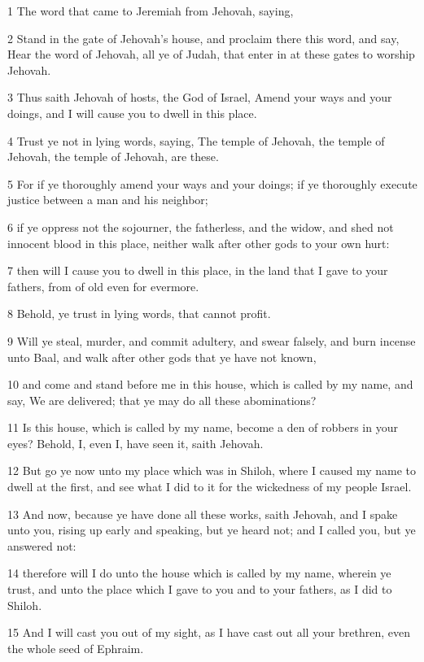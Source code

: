 \par 1 The word that came to Jeremiah from Jehovah, saying,
\par 2 Stand in the gate of Jehovah's house, and proclaim there this word, and say, Hear the word of Jehovah, all ye of Judah, that enter in at these gates to worship Jehovah.
\par 3 Thus saith Jehovah of hosts, the God of Israel, Amend your ways and your doings, and I will cause you to dwell in this place.
\par 4 Trust ye not in lying words, saying, The temple of Jehovah, the temple of Jehovah, the temple of Jehovah, are these.
\par 5 For if ye thoroughly amend your ways and your doings; if ye thoroughly execute justice between a man and his neighbor;
\par 6 if ye oppress not the sojourner, the fatherless, and the widow, and shed not innocent blood in this place, neither walk after other gods to your own hurt:
\par 7 then will I cause you to dwell in this place, in the land that I gave to your fathers, from of old even for evermore.
\par 8 Behold, ye trust in lying words, that cannot profit.
\par 9 Will ye steal, murder, and commit adultery, and swear falsely, and burn incense unto Baal, and walk after other gods that ye have not known,
\par 10 and come and stand before me in this house, which is called by my name, and say, We are delivered; that ye may do all these abominations?
\par 11 Is this house, which is called by my name, become a den of robbers in your eyes? Behold, I, even I, have seen it, saith Jehovah.
\par 12 But go ye now unto my place which was in Shiloh, where I caused my name to dwell at the first, and see what I did to it for the wickedness of my people Israel.
\par 13 And now, because ye have done all these works, saith Jehovah, and I spake unto you, rising up early and speaking, but ye heard not; and I called you, but ye answered not:
\par 14 therefore will I do unto the house which is called by my name, wherein ye trust, and unto the place which I gave to you and to your fathers, as I did to Shiloh.
\par 15 And I will cast you out of my sight, as I have cast out all your brethren, even the whole seed of Ephraim.
